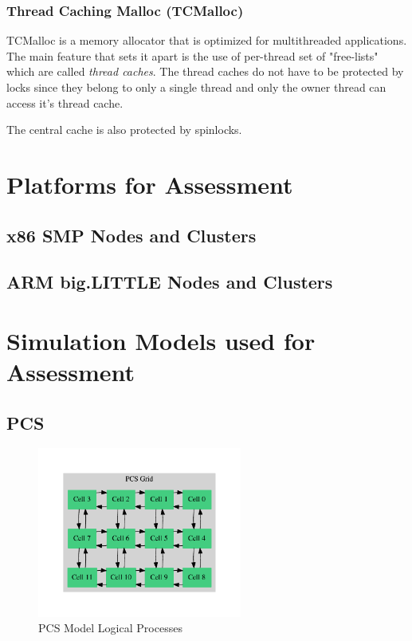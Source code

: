 \documentclass[11pt]{book}
\begin{document}
\subsubsection{Thread Caching Malloc (TCMalloc)}

TCMalloc is a memory allocator that is optimized for multithreaded applications. The main
feature that sets it apart is the use of per-thread set of "free-lists" which are called
\emph{thread caches}. The thread caches do not have to be protected by locks since they
belong to only a single thread and only the owner thread can access it's thread cache.

The central cache is also protected by spinlocks.

\section{Platforms for Assessment}

\subsection{x86 SMP Nodes and Clusters}

\subsection{ARM big.LITTLE Nodes and Clusters}

\section{Simulation Models used for Assessment}

\subsection{PCS}

\begin{figure}[H]
    \centering
    \includegraphics[width=0.6\textwidth]{figs/graphviz/pcs_model.pdf}
    \caption{PCS Model Logical Processes}\label{pcs_model_lps}
\end{figure}
\end{document}
